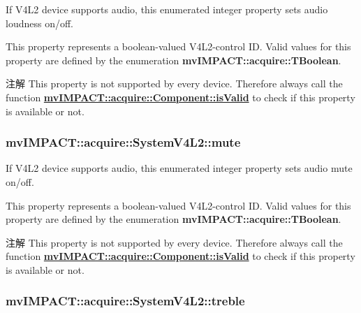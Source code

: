 If V4\+L2 device supports audio, this enumerated integer property sets audio loudness on/off. 

This property represents a boolean-\/valued V4\+L2-\/control I\+D. Valid values for this property are defined by the enumeration {\bfseries mv\+I\+M\+P\+A\+C\+T\+::acquire\+::\+T\+Boolean}.

\begin{DoxyNote}{注解}
This property is not supported by every device. Therefore always call the function {\bfseries \hyperlink{classmv_i_m_p_a_c_t_1_1acquire_1_1_component_ac51e55e7e046101f3c6119d84123abd5}{mv\+I\+M\+P\+A\+C\+T\+::acquire\+::\+Component\+::is\+Valid}} to check if this property is available or not. 
\end{DoxyNote}
\hypertarget{classmv_i_m_p_a_c_t_1_1acquire_1_1_system_v4_l2_a10c2ec2e367c18d8c1d0e74ea517800d}{
\subsubsection[{mute}]{ mv\+I\+M\+P\+A\+C\+T\+::acquire\+::\+System\+V4\+L2\+::mute}}\label{classmv_i_m_p_a_c_t_1_1acquire_1_1_system_v4_l2_a10c2ec2e367c18d8c1d0e74ea517800d}


If V4\+L2 device supports audio, this enumerated integer property sets audio mute on/off. 

This property represents a boolean-\/valued V4\+L2-\/control I\+D. Valid values for this property are defined by the enumeration {\bfseries mv\+I\+M\+P\+A\+C\+T\+::acquire\+::\+T\+Boolean}.

\begin{DoxyNote}{注解}
This property is not supported by every device. Therefore always call the function {\bfseries \hyperlink{classmv_i_m_p_a_c_t_1_1acquire_1_1_component_ac51e55e7e046101f3c6119d84123abd5}{mv\+I\+M\+P\+A\+C\+T\+::acquire\+::\+Component\+::is\+Valid}} to check if this property is available or not. 
\end{DoxyNote}
\hypertarget{classmv_i_m_p_a_c_t_1_1acquire_1_1_system_v4_l2_a09176cb99b8be1e10aaf20ecb02727c2}{
\subsubsection[{treble}]{ mv\+I\+M\+P\+A\+C\+T\+::acquire\+::\+System\+V4\+L2\+::treble}}\label{classmv_i_m_p_a_c_t_1_1acquire_1_1_system_v4_l2_a09176cb99b8be1e10aaf20ecb02727c2}


